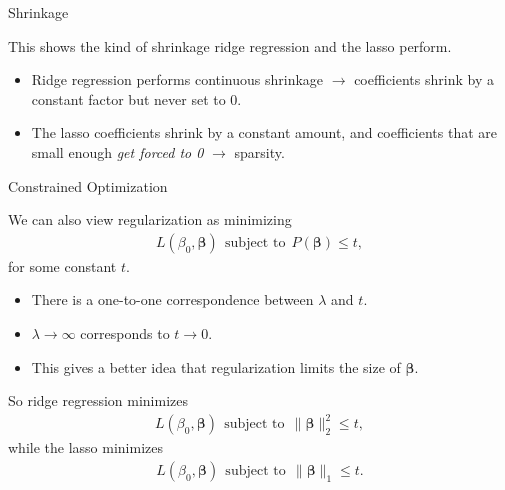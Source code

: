 \documentclass[8pt]{beamer}
\newcommand{\mys}{\vspace{0.5cm} %
}
\begin{document}
\begin{frame}{Shrinkage}


This shows the kind of shrinkage ridge regression and the lasso perform.
\begin{itemize}
    \item Ridge regression performs continuous shrinkage $\to$ coefficients shrink by a constant factor but never set to 0.
    \item The lasso coefficients shrink by a constant amount, and coefficients that are small enough \textit{get forced to 0} $\to$ sparsity. %
\end{itemize}
    
\end{frame}

\begin{frame}{\color{white} Constrained Optimization}

We can also view regularization as minimizing 
\begin{align*}
    L(\beta_0, \bm{\beta}) ~~\text{subject to}~~ P(\bm{\beta}) \le t,
\end{align*}
for some constant $t$.
\begin{itemize}
    \item There is a one-to-one correspondence between $\lambda$ and $t$.
    \item $\lambda \to \infty$ corresponds to $t \to 0$.
    \item This gives a better idea that regularization limits the size of $\bm{\beta}$.
\end{itemize} \mys 

So ridge regression minimizes 
\begin{align*}
    L(\beta_0, \bm{\beta}) ~~\text{subject to}~~ \| \bm{\beta} \|_2^2 \le t,
\end{align*}
while the lasso minimizes
\begin{align*}
    L(\beta_0, \bm{\beta}) ~~\text{subject to}~~ \| \bm{\beta} \|_1 \le t.
\end{align*}
    
\end{frame}
\end{document}
